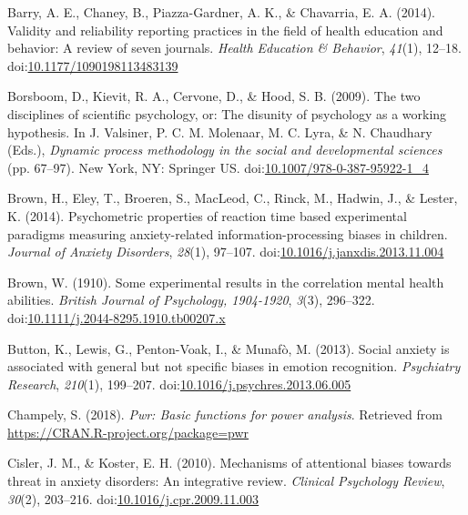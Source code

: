 \documentclass[english,,man,floatsintext]{apa6}
\begin{document}
\leavevmode\hypertarget{ref-barry_validity_2014}{}%
Barry, A. E., Chaney, B., Piazza-Gardner, A. K., \& Chavarria, E. A. (2014). Validity and reliability reporting practices in the field of health education and behavior: A review of seven journals. \emph{Health Education \& Behavior}, \emph{41}(1), 12--18. doi:\href{https://doi.org/10.1177/1090198113483139}{10.1177/1090198113483139}

\leavevmode\hypertarget{ref-valsiner_two_2009}{}%
Borsboom, D., Kievit, R. A., Cervone, D., \& Hood, S. B. (2009). The two disciplines of scientific psychology, or: The disunity of psychology as a working hypothesis. In J. Valsiner, P. C. M. Molenaar, M. C. Lyra, \& N. Chaudhary (Eds.), \emph{Dynamic process methodology in the social and developmental sciences} (pp. 67--97). New York, NY: Springer US. doi:\href{https://doi.org/10.1007/978-0-387-95922-1_4}{10.1007/978-0-387-95922-1\_4}

\leavevmode\hypertarget{ref-brown_psychometric_2014}{}%
Brown, H., Eley, T., Broeren, S., MacLeod, C., Rinck, M., Hadwin, J., \& Lester, K. (2014). Psychometric properties of reaction time based experimental paradigms measuring anxiety-related information-processing biases in children. \emph{Journal of Anxiety Disorders}, \emph{28}(1), 97--107. doi:\href{https://doi.org/10.1016/j.janxdis.2013.11.004}{10.1016/j.janxdis.2013.11.004}

\leavevmode\hypertarget{ref-brown_experimental_1910}{}%
Brown, W. (1910). Some experimental results in the correlation mental health abilities. \emph{British Journal of Psychology, 1904-1920}, \emph{3}(3), 296--322. doi:\href{https://doi.org/10.1111/j.2044-8295.1910.tb00207.x}{10.1111/j.2044-8295.1910.tb00207.x}

\leavevmode\hypertarget{ref-button_social_2013}{}%
Button, K., Lewis, G., Penton-Voak, I., \& Munafò, M. (2013). Social anxiety is associated with general but not specific biases in emotion recognition. \emph{Psychiatry Research}, \emph{210}(1), 199--207. doi:\href{https://doi.org/10.1016/j.psychres.2013.06.005}{10.1016/j.psychres.2013.06.005}

\leavevmode\hypertarget{ref-R-pwr}{}%
Champely, S. (2018). \emph{Pwr: Basic functions for power analysis}. Retrieved from \url{https://CRAN.R-project.org/package=pwr}

\leavevmode\hypertarget{ref-cisler_mechanisms_2010}{}%
Cisler, J. M., \& Koster, E. H. (2010). Mechanisms of attentional biases towards threat in anxiety disorders: An integrative review. \emph{Clinical Psychology Review}, \emph{30}(2), 203--216. doi:\href{https://doi.org/10.1016/j.cpr.2009.11.003}{10.1016/j.cpr.2009.11.003}
\end{document}
